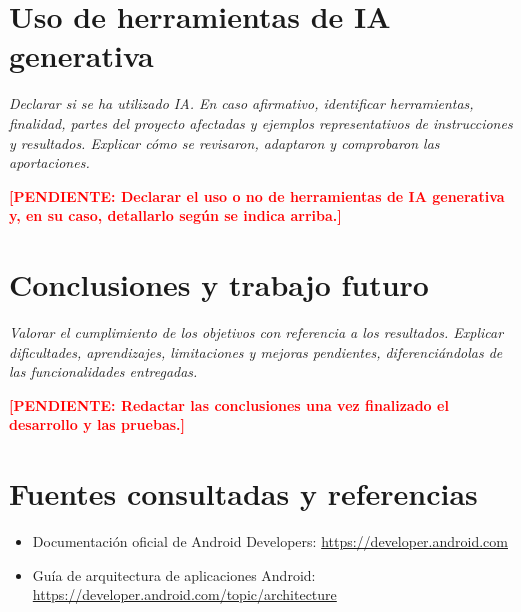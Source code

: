 \documentclass[11pt,a4paper]{article}
\newcommand{\pendiente}[1]{\textcolor{red}{\textbf{[PENDIENTE: #1]}}}
\begin{document}
\section{Uso de herramientas de IA generativa}
\textit{Declarar si se ha utilizado IA. En caso afirmativo, identificar herramientas, finalidad, partes del proyecto afectadas y ejemplos representativos de instrucciones y resultados. Explicar cómo se revisaron, adaptaron y comprobaron las aportaciones.}

\pendiente{Declarar el uso o no de herramientas de IA generativa y, en su caso, detallarlo según se indica arriba.}

\section{Conclusiones y trabajo futuro}
\textit{Valorar el cumplimiento de los objetivos con referencia a los resultados. Explicar dificultades, aprendizajes, limitaciones y mejoras pendientes, diferenciándolas de las funcionalidades entregadas.}

\pendiente{Redactar las conclusiones una vez finalizado el desarrollo y las pruebas.}

\section*{Fuentes consultadas y referencias}
\begin{itemize}
    \item Documentación oficial de Android Developers: \url{https://developer.android.com}
    \item Guía de arquitectura de aplicaciones Android: \url{https://developer.android.com/topic/architecture}
\end{itemize}
\end{document}
